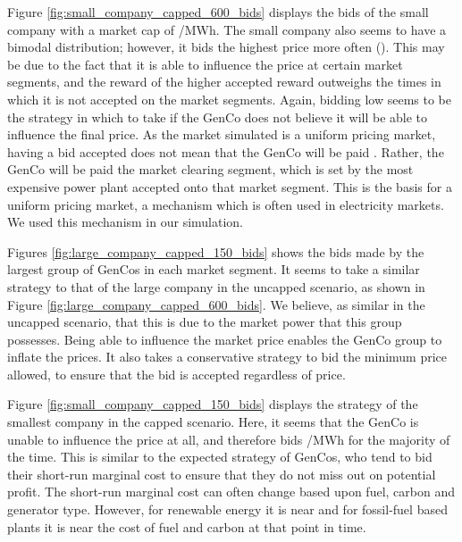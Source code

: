 \documentclass[conference]{IEEEtran}
\begin{document}
Figure \ref{fig:small_company_capped_600_bids} displays the bids of the small company with a market cap of /MWh. The small company also seems to have a bimodal distribution; however, it bids the highest price more often (). This may be due to the fact that it is able to influence the price at certain market segments, and the reward of the higher accepted reward outweighs the times in which it is not accepted on the market segments. Again, bidding low seems to be the strategy in which to take if the GenCo does not believe it will be able to influence the final price. As the market simulated is a uniform pricing market, having a  bid accepted does not mean that the GenCo will be paid . Rather, the GenCo will be paid the market clearing segment, which is set by the most expensive power plant accepted onto that market segment. This is the basis for a uniform pricing market, a mechanism which is often used in electricity markets. We used this mechanism in our simulation.



Figures \ref{fig:large_company_capped_150_bids} shows the bids made by the largest group of GenCos in each market segment. It seems to take a similar strategy to that of the large company in the uncapped scenario, as shown in Figure \ref{fig:large_company_capped_600_bids}. We believe, as similar in the uncapped scenario, that this is due to the market power that this group possesses. Being able to influence the market price enables the GenCo group to inflate the prices. It also takes a conservative strategy to bid the minimum price allowed, to ensure that the bid is accepted regardless of price.

Figure \ref{fig:small_company_capped_150_bids} displays the strategy of the smallest company in the capped scenario. Here, it seems that the GenCo is unable to influence the price at all, and therefore bids /MWh for the majority of the time. This is similar to the expected strategy of GenCos, who tend to bid their short-run marginal cost to ensure that they do not miss out on potential profit. The short-run marginal cost can often change based upon fuel, carbon and generator type. However, for renewable energy it is near  and for fossil-fuel based plants it is near the cost of fuel and carbon at that point in time.
\end{document}
